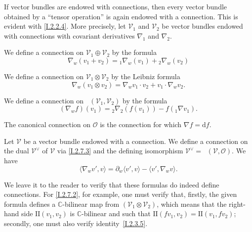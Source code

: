 \documentclass{report}
\theoremstyle{plain}
\theoremstyle{definition}
\newenvironment{env}[1]
    {\renewcommand\theinnercustomenv{#1}\innercustomenv}
    {\endinnercustomenv}
\newcommand{\sh}{\mathscr}
\newcommand{\dd}{\mathrm{d}}
\DeclareMathOperator{\shHom}{\underline{Hom}}
\begin{document}
\begin{env}{2.7}
\label{I.2.7}
  If vector bundles are endowed with connections, then every vector bundle obtained by a ``tensor operation'' is again endowed with a connection.
  This is evident with \cref{I.2.2.4}.
  More precisely, let $\sh{V}_1$ and $\sh{V}_2$ be vector bundles endowed with connections with covariant derivatives $\nabla_1$ and $\nabla_2$.

  \begin{env}{2.7.1}
  \label{I.2.7.1}
    We define a connection on $\sh{V}_1\oplus\sh{V}_2$ by the formula
    \[
      \nabla_w(v_1+v_2) = {}_1\!\nabla_w(v_1) + {}_2\!\nabla_w(v_2)
    \]
  \end{env}

  \begin{env}{2.7.2}
  \label{I.2.7.2}
    We define a connection on $\sh{V}_1\otimes\sh{V}_2$ by the Leibniz formula
    \[
      \nabla_w(v_1\otimes v_2) = \nabla_w v_1\cdot v_2 + v_1\cdot\nabla_w v_2.
    \]
  \end{env}

  \begin{env}{2.7.3}
  \label{I.2.7.3}
    We define a connection on $\shHom(\sh{V}_1,\sh{V}_2)$ by the formula
    \[
      (\nabla_w f)(v_1) = {}_2\!\nabla_2(f(v_1)) - f({}_1\!\nabla v_1).
    \]
  \end{env}

  The canonical connection on $\sh{O}$ is the connection for which $\nabla f=\dd f$.
  
  Let $\sh{V}$ be a vector bundle endowed with a connection.
  \begin{env}{2.7.4}
  \label{I.2.7.4}
    We define a connection on the dual $\sh{V}^\vee$ of $\sh{V}$ via \cref{I.2.7.3} and the defining isomorphism $\sh{V}^\vee = \shHom(\sh{V},\sh{O})$.
    We have
    \[
      \langle \nabla_w v',v \rangle = \partial_w\langle v',v \rangle - \langle v',\nabla_w v \rangle.
    \]
  \end{env}

  We leave it to the reader to verify that these formulas do indeed define connections.
  For \cref{I.2.7.2}, for example, one must verify that, firstly, the given formula defines a $\mathbb{C}$-bilinear map from $(\sh{V}_1\otimes\sh{V}_2)$, which means that the right-hand side $\mathrm{II}(v_1,v_2)$ is $\mathbb{C}$-bilinear and such that $\mathrm{II}(fv_1,v_2)=\mathrm{II}(v_1,fv_2)$;
  secondly, one must also verify identity~\cref{I.2.3.5}.
\end{env}
\end{document}
